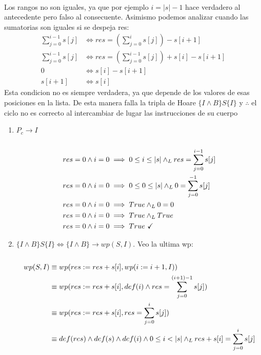 \documentclass{article}
\begin{document}
\begin{itemize}
{\begin{align}
    \end{align}
    Los rangos no son iguales, ya que por ejemplo $i=|s|-1$ hace verdadero al antecedente pero falso al consecuente.
    Asimismo podemos analizar cuando las sumatorias son iguales si se despeja res:
    \cont\begin{align}
        \sum\limits_{j=0}^{i-1}s[j] &\Longleftrightarrow res=(\sum\limits_{j=0}^{i}s[j])-s[i+1]\\
        \sum\limits_{j=0}^{i-1}s[j] &\Longleftrightarrow res=(\sum\limits_{j=0}^{i-1}s[j])+s[i]-s[i+1]\\
        0 &\Longleftrightarrow s[i]-s[i+1]\\
        s[i+1] &\Longleftrightarrow s[i]
    \end{align}
    Esta condicion no es siempre verdadera, ya que depende de los valores de esas posiciones en la lista. 
    De esta manera falla la tripla de Hoare $\{I\land B\}S\{I\}$ y $\therefore$ el ciclo no es correcto al
    intercambiar de lugar las instrucciones de su cuerpo
    \item [e) ]
    \begin{enumerate}
        \item $P_c \to I$\\\\
        \cont\begin{align}
            res=0 \land i=0 &\implies 0\leq i \leq|s| \land_L res=\sum\limits_{j=0}^{i-1}s[j]\\
            res=0 \land i=0 &\implies 0\leq 0 \leq|s| \land_L 0=\sum\limits_{j=0}^{-1}s[j]\\
            res=0 \land i=0 &\implies True \land_L 0=0\\
            res=0 \land i=0 &\implies True \land_L True\\
            res=0 \land i=0 &\implies True\ \checkmark
        \end{align}
        \item $\{I\land B\}S\{I\}\Longleftrightarrow \{I\land B\}\to wp(S,I)$. Veo la ultima wp:\\\\
        \cont\begin{align}
            wp(S,I)&\equiv wp(res:=res+s[i],wp(i:=i+1,I))\\
            &\equiv wp(res:=res+s[i],def(i)\land res=\sum\limits_{j=0}^{(i+1)-1}s[j])\\
            &\equiv wp(res:=res+s[i],res=\sum\limits_{j=0}^{i}s[j])\\
            &\equiv def(res)\land def(s)\land def(i)\land \enRango{i}{s}\land_L res+s[i]=\sum\limits_{j=0}^{i}s[j]\\

\end{align}
\end{enumerate}}
\end{itemize}
\end{document}
